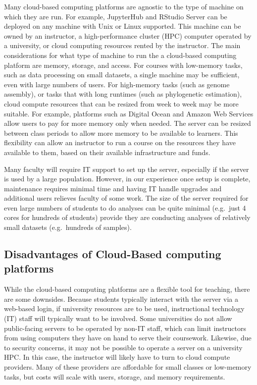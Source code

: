 Many cloud-based computing platforms are agnostic to the type of machine on which they are run. 
For example, JupyterHub and RStudio Server can be deployed on any machine with Unix or Linux supported. 
This machine can be owned by an instructor, a high-performance cluster (HPC) computer operated by a university, or cloud 
computing resources rented by the instructor.
The main considerations for what type of machine to run the a cloud-based computing platform are memory, storage, and access.
For courses with low-memory tasks, such as data processing on small datasets, a single machine may be sufficient, even with large numbers of users.
For high-memory tasks (such as genome assembly), or tasks that with long runtimes (such as phylogenetic estimation), 
cloud compute resources that can be resized from week to week may be more suitable.
For example, platforms such as Digital Ocean and Amazon Web Services allow users to pay for more memory only when needed. 
The server can be resized between class periods to allow more memory to be available to learners.
This flexibility can allow an instructor to run a course on the resources they have available to them, based on their available infrastructure and funds.

Many faculty will require IT support to set up the server, especially if the server is used by a large population. However, in our experience once setup is complete, maintenance requires minimal time and having IT handle upgrades and additional users relieves faculty of some work. The size of the server required for even large numbers of students to do analyses can be quite minimal (e.g.\ just 4 cores for hundreds of students) provide they are conducting analyses of relatively small datasets (e.g.\ hundreds of samples). 

\subsection{Disadvantages of Cloud-Based computing platforms}\label{subsub:cloud-disdvantage}

While the cloud-based computing platforms are a flexible tool for teaching, there are some downsides.
Because students typically interact with the server via a web-based login, if university resources are to be used, 
instructional technology (IT) staff will typically want to be involved.
Some universities do not allow public-facing servers to be operated by non-IT staff, which can 
limit instructors from using computers they have on hand to serve their coursework.
Likewise, due to security concerns, it may not be possible to operate a server on a university HPC.
In this case, the instructor will likely have to turn to cloud compute providers.
Many of these providers are affordable for small classes or low-memory tasks, but costs will scale with users, storage, and memory requirements.

